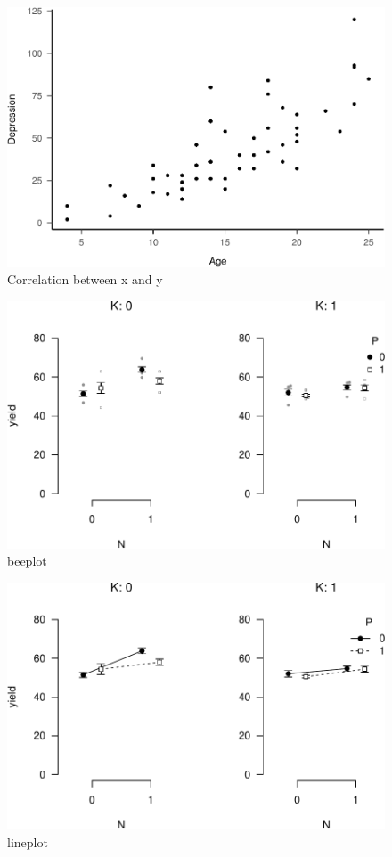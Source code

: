 \documentclass[
  english,
  man,draftall]{apa6}
\begin{document}
\begin{figure}
\centering
\includegraphics{paper_files/figure-latex/unnamed-chunk-2-1.pdf}
\caption{\label{fig:unnamed-chunk-2}Correlation between x and y}
\end{figure}

\begin{figure}
\centering
\includegraphics{paper_files/figure-latex/unnamed-chunk-3-1.pdf}
\caption{\label{fig:unnamed-chunk-3}beeplot}
\end{figure}

\begin{figure}
\centering
\includegraphics{paper_files/figure-latex/unnamed-chunk-4-1.pdf}
\caption{\label{fig:unnamed-chunk-4}lineplot}
\end{figure}
\end{document}
